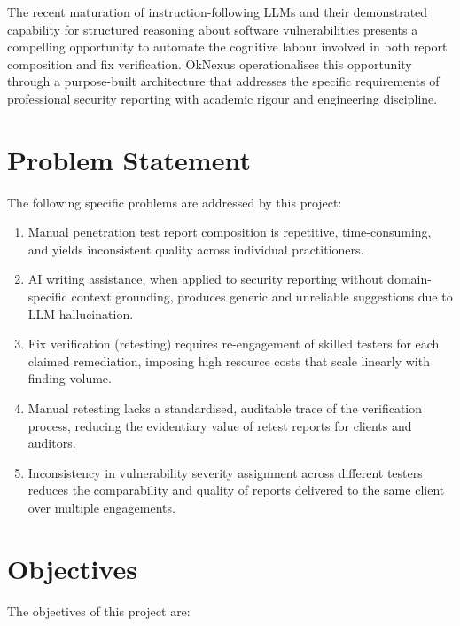 The recent maturation of instruction-following LLMs and their demonstrated capability for structured reasoning about software vulnerabilities \cite{llm_cybersecurity_survey2024} presents a compelling opportunity to automate the cognitive labour involved in both report composition and fix verification. OkNexus operationalises this opportunity through a purpose-built architecture that addresses the specific requirements of professional security reporting with academic rigour and engineering discipline.

\section{Problem Statement}

The following specific problems are addressed by this project:

\begin{enumerate}
    \item Manual penetration test report composition is repetitive, time-consuming, and yields inconsistent quality across individual practitioners.

    \item AI writing assistance, when applied to security reporting without domain-specific context grounding, produces generic and unreliable suggestions due to LLM hallucination.

    \item Fix verification (retesting) requires re-engagement of skilled testers for each claimed remediation, imposing high resource costs that scale linearly with finding volume.

    \item Manual retesting lacks a standardised, auditable trace of the verification process, reducing the evidentiary value of retest reports for clients and auditors.

    \item Inconsistency in vulnerability severity assignment across different testers reduces the comparability and quality of reports delivered to the same client over multiple engagements.
\end{enumerate}

\section{Objectives}

The objectives of this project are:

